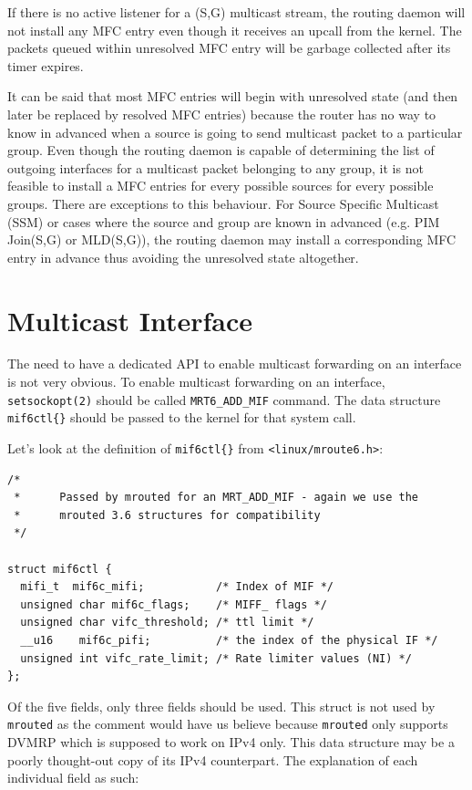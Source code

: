 \documentclass{article}
\begin{document}
If there is no active listener for a (S,G) multicast stream, the routing daemon
will not install any MFC entry even though it receives an upcall from the
kernel. The packets queued within unresolved MFC entry will be garbage collected
after its timer expires.

It can be said that most MFC entries will begin with unresolved state (and then
later be replaced by resolved MFC entries) because the router has no way to know
in advanced when a source is going to send multicast packet to a particular
group. Even though the routing daemon is capable of determining the list of
outgoing interfaces for a multicast packet belonging to any group, it is not
feasible to install a MFC entries for every possible sources for every possible
groups. There are exceptions to this behaviour. For Source Specific Multicast
(SSM) or cases where the source and group are known in advanced (e.g.  PIM
Join(S,G) or MLD(S,G)), the routing daemon may install a corresponding MFC entry
in advance thus avoiding the unresolved state altogether.

\section{Multicast Interface}
\label{sec:multicast-interface}
The need to have a dedicated API to enable multicast forwarding on an interface 
is not very obvious. To enable multicast forwarding on an interface,
\texttt{setsockopt(2)} should be called \texttt{MRT6\_ADD\_MIF} command. The data
structure \texttt{mif6ctl\{\}} should be passed to the kernel for that system
call. 

Let's look at the definition of \texttt{mif6ctl\{\}} from
\texttt{<linux/mroute6.h>}:

\begin{lstlisting}[basicstyle=\footnotesize]
/*
 *      Passed by mrouted for an MRT_ADD_MIF - again we use the
 *      mrouted 3.6 structures for compatibility
 */

struct mif6ctl {
  mifi_t  mif6c_mifi;           /* Index of MIF */
  unsigned char mif6c_flags;    /* MIFF_ flags */
  unsigned char vifc_threshold; /* ttl limit */
  __u16    mif6c_pifi;          /* the index of the physical IF */
  unsigned int vifc_rate_limit; /* Rate limiter values (NI) */
};
\end{lstlisting}

Of the five fields, only three fields should be used. This struct is not used by 
\texttt{mrouted} as the comment would have us believe because \texttt{mrouted}
only supports DVMRP which is supposed to work on IPv4 only. This data structure
may be a poorly thought-out copy of its IPv4 counterpart. The explanation of
each individual field as such:
\end{document}
